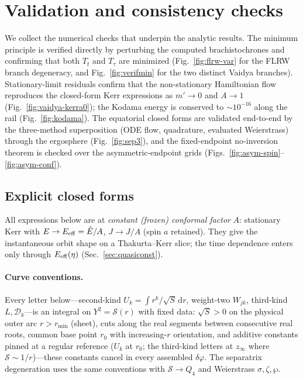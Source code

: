 \documentclass[
    aps, prd, twocolumn, superscriptaddress,
    showpacs, nofootinbib, floatfix
]{revtex4-2}
\newcommand{\Ehat}{\hat E}
\newcommand{\dd}{\mathrm{d}}
\begin{document}
\clearpage
\appendix
\section{Validation and consistency checks}
\label{app:validation}
We collect the numerical checks that underpin the analytic results. The
minimum principle is verified directly by perturbing the computed
brachistochrones and confirming that both $T_t$ and $T_\tau$ are minimized
(Fig.~\ref{fig:flrw-var} for the FLRW branch degeneracy, and
Fig.~\ref{fig:verifmin} for the two distinct Vaidya branches). Stationary-limit
residuals confirm that the non-stationary
Hamiltonian flow reproduces the closed-form Kerr expressions as $m'\to0$ and
$A\to1$ (Fig.~\ref{fig:vaidya-kerra0}); the Kodama energy is conserved to
$\sim10^{-16}$ along the rail (Fig.~\ref{fig:kodama}). The equatorial closed
forms are validated end-to-end by the three-method superposition
(ODE flow, quadrature, evaluated Weierstrass) through the ergosphere
(Fig.~\ref{fig:sep3}), and the fixed-endpoint no-inversion theorem is
checked over the asymmetric-endpoint grids (Figs.~\ref{fig:asym-spin}--%
\ref{fig:asym-conf}).

\subsection{Explicit closed forms}
\label{app:explicit}

All expressions below are at \emph{constant (frozen) conformal factor} $A$:
stationary Kerr with $E\to E_{\rm eff}=\Ehat/A$, $J\to J/A$ (spin $a$ retained). They give
the instantaneous orbit shape on a Thakurta--Kerr slice; the time dependence
enters only through $E_{\rm eff}(\eta)$ (Sec.~\ref{sec:quasiconst}).

\paragraph{Curve conventions.} Every letter below---second-kind
$U_k=\int r^k/\sqrt S\,\dd r$, weight-two $W_{jk}$, third-kind $L,\mathcal D_k$---is an
integral on $Y^2=\mathcal S(r)$ with fixed data: $\sqrt S>0$ on the physical outer arc
$r>r_{\min}$ (sheet), cuts along the real segments between consecutive real roots,
common base point $r_0$ with increasing-$r$ orientation, and additive constants pinned
at a regular reference ($U_k$ at $r_0$; the third-kind letters at $z_\infty$ where
$\mathcal S\sim1/r$)---these constants cancel in every assembled $\delta\varphi$. The
separatrix degeneration uses the same conventions with $\mathcal S\to Q_4$ and
Weierstrass $\sigma,\zeta,\wp$.
\end{document}
